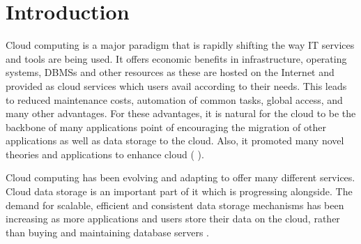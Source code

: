 \chapter{Introduction} 
Cloud computing is a major paradigm that is rapidly shifting the way IT services
and tools are being used.  %
It offers economic benefits in infrastructure,  operating systems,  \acp{DBMS}  and
other resources as these are hosted on the Internet and provided as cloud
services which users avail  according to their needs. 
This leads to reduced maintenance costs,  automation of common tasks,  global
access,  and many other advantages.  
For these advantages,  it is natural for the cloud to be the
backbone of  many applications 
point of  encouraging the migration of other  applications  as well as data storage to the cloud.  Also,  it  promoted many novel
theories and applications to enhance cloud ( ). 

Cloud computing has been evolving and adapting to offer many different
services.  Cloud data storage is an important part of it which is progressing
alongside. 
The demand for scalable,  efficient and consistent data storage mechanisms has
been increasing as more applications  and users store their data  on the cloud, 
rather than buying and maintaining database servers   . 



